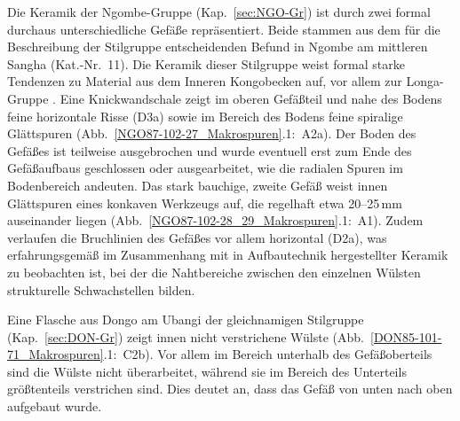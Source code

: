 \begin{multicols}{2}
Die Keramik der Ngombe-Gruppe (Kap.~\ref{sec:NGO-Gr}) ist durch zwei formal durchaus unterschiedliche Gefäße repräsentiert. Beide stammen aus dem für die Beschreibung der Stilgruppe entscheidenden Befund in Ngombe am mittleren \mbox{Sangha} (Kat.-Nr.~11). Die Keramik dieser Stilgruppe weist formal starke Tendenzen zu Material aus dem Inneren Kongobecken auf, vor allem zur Longa-Gruppe \parencite[121--128]{Wotzka.1995}. Eine Knickwandschale zeigt im oberen Gefäßteil und nahe des Bodens feine horizontale Risse (D3a) sowie im Bereich des Bodens feine spiralige Glättspuren (Abb.~\ref{NGO87-102-27_Makrospuren}.1:~A2a). Der Boden des Gefäßes ist teilweise ausgebrochen und wurde eventuell erst zum Ende des Gefäßaufbaus geschlossen oder ausgearbeitet, wie die radialen Spuren im Bodenbereich andeuten. Das stark bauchige, zweite Gefäß weist innen Glättspuren eines konkaven Werkzeugs auf, die regelhaft etwa 20--25\,mm auseinander liegen (Abb.~\ref{NGO87-102-28_29_Makrospuren}.1:~A1). Zudem verlaufen die Bruchlinien des Gefäßes vor allem horizontal (D2a), was erfahrungsgemäß im Zusammenhang mit in Aufbautechnik hergestellter Keramik zu beobachten ist, bei der die Nahtbereiche zwischen den einzelnen Wülsten strukturelle Schwachstellen bilden.

Eine Flasche aus Dongo am \mbox{Ubangi} der gleichnamigen Stilgruppe (Kap.~\ref{sec:DON-Gr}) zeigt innen nicht verstrichene Wülste (Abb.~\ref{DON85-101-71_Makrospuren}.1:~C2b). Vor allem im Bereich unterhalb des Gefäßoberteils sind die Wülste nicht überarbeitet, während sie im Bereich des Unterteils größtenteils verstrichen sind. Dies deutet an, dass das Gefäß von unten nach oben aufgebaut wurde.


\end{multicols}

